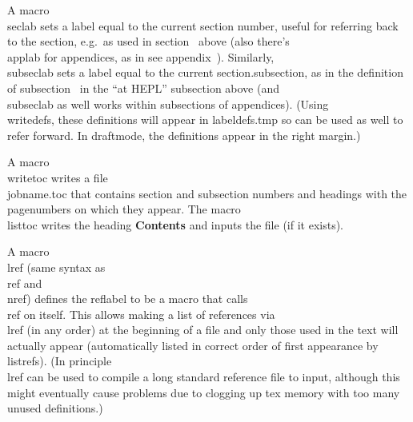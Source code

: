 \applab\appC

A macro \\seclab  sets a label equal to the current section number, useful
for referring back to the section, e.g.\ as used in section \sconcl\ above
(also there's \\applab for appendices, as in see appendix~\appC).
Similarly, \\subseclab sets a label equal to the current
section.subsection, as in the definition of subsection \shepl\ in the ``at
HEPL'' subsection above (and \\subseclab as well works within subsections
of appendices).
(Using \\writedefs, these definitions will appear in labeldefs.tmp so can
be used as well to refer forward. In draftmode, the definitions appear in
the right margin.)

A macro \\writetoc writes a file \\jobname.toc that contains section and
subsection  numbers and headings with the pagenumbers on which they appear.
The macro \\listtoc writes the heading {\bf Contents} and inputs the file
(if it exists).


A macro \\lref (same syntax as \\ref and \\nref) 
\lref{}
defines the reflabel to be a macro that calls \\ref on itself.
This allows making a list of references via \\lref (in any order) at the 
beginning of a file and only those used in the text will actually appear
(automatically listed in correct order of first appearance by \\listrefs).
(In principle \\lref can be used to compile a long standard reference file 
to input, although this might eventually cause problems due to clogging up tex
memory with too many unused definitions.)

